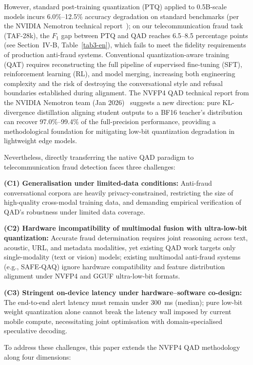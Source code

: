\documentclass[lettersize,journal]{IEEEtran}
\begin{document}
However, standard post-training quantization (PTQ) applied to 0.5B-scale models incurs 6.0\%--12.5\% accuracy degradation on standard benchmarks (per the NVIDIA Nemotron technical report~\cite{3}); on our telecommunication fraud task (TAF-28k), the $F_1$ gap between PTQ and QAD reaches 6.5--8.5 percentage points (see Section~IV-B, Table~\ref{tab3-en}), which fails to meet the fidelity requirements of production anti-fraud systems. Conventional quantization-aware training (QAT) requires reconstructing the full pipeline of supervised fine-tuning (SFT), reinforcement learning (RL), and model merging, increasing both engineering complexity and the risk of destroying the conversational style and refusal boundaries established during alignment. The NVFP4 QAD technical report from the NVIDIA Nemotron team (Jan 2026)~\cite{3} suggests a new direction: pure KL-divergence distillation aligning student outputs to a BF16 teacher's distribution can recover 97.0\%--99.4\% of the full-precision performance, providing a methodological foundation for mitigating low-bit quantization degradation in lightweight edge models.

Nevertheless, directly transferring the native QAD paradigm to telecommunication fraud detection faces three challenges:

\textbf{(C1) Generalisation under limited-data conditions:} Anti-fraud conversational corpora are heavily privacy-constrained, restricting the size of high-quality cross-modal training data, and demanding empirical verification of QAD's robustness under limited data coverage.

\textbf{(C2) Hardware incompatibility of multimodal fusion with ultra-low-bit quantization:} Accurate fraud determination requires joint reasoning across text, acoustic, URL, and metadata modalities, yet existing QAD work targets only single-modality (text or vision) models; existing multimodal anti-fraud systems (e.g., SAFE-QAQ) ignore hardware compatibility and feature distribution alignment under NVFP4 and GGUF ultra-low-bit formats.

\textbf{(C3) Stringent on-device latency under hardware--software co-design:} The end-to-end alert latency must remain under 300~ms (median); pure low-bit weight quantization alone cannot break the latency wall imposed by current mobile compute, necessitating joint optimisation with domain-specialised speculative decoding.

To address these challenges, this paper extends the NVFP4 QAD methodology along four dimensions:
\end{document}
